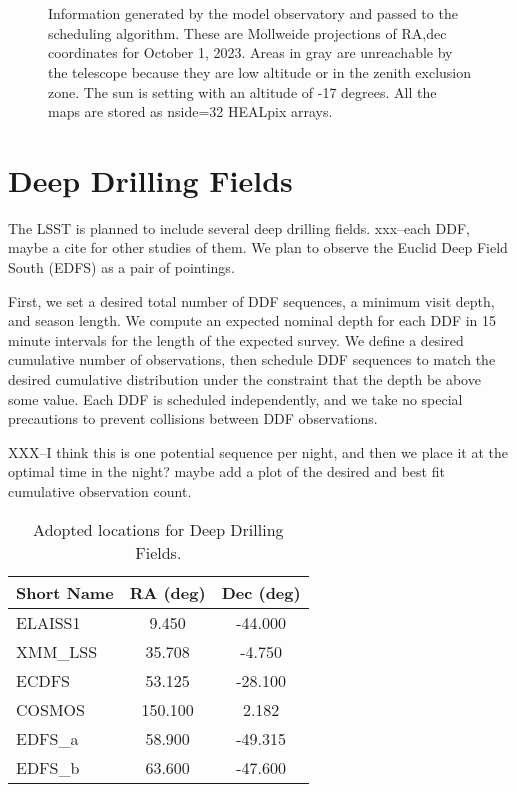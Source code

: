 \documentclass[]{aastex631}
\begin{document}
\begin{figure}
     \\
     \\
    \caption{Information generated by the model observatory and passed to the scheduling algorithm. These are Mollweide projections of RA,dec coordinates for October 1, 2023. Areas in gray are unreachable by the telescope because they are low altitude or in the zenith exclusion zone. The sun is setting with an altitude of -17 degrees. All the maps are stored as nside=32 HEALpix arrays. }
    \label{fig:conditions}
\end{figure}


\section{Deep Drilling Fields}

The LSST is planned to include several deep drilling fields. xxx--each DDF, maybe a cite for other studies of them. We plan to observe the Euclid Deep Field South (EDFS) as a pair of pointings. 

First, we set a desired total number of DDF sequences, a minimum visit depth, and season length. We compute an expected nominal depth for each DDF in 15 minute intervals for the length of the expected survey. We define a desired cumulative number of observations, then schedule DDF sequences to match the desired cumulative distribution under the constraint that the depth be above some value. Each DDF is scheduled independently, and we take no special precautions to prevent collisions between DDF observations. 

XXX--I think this is one potential sequence per night, and then we place it at the optimal time in the night? maybe add a plot of the desired and best fit cumulative observation count.



\begin{table}
    \centering
        \begin{tabular}{lcc}
        \toprule
        Short Name &      RA (deg) &     Dec (deg) \\
        \hline
           ELAISS1 &   9.450 & -44.000 \\
           XMM\_LSS &  35.708 &  -4.750 \\
             ECDFS &  53.125 & -28.100 \\
            COSMOS & 150.100 &   2.182 \\
            EDFS\_a &  58.900 & -49.315 \\
            EDFS\_b &  63.600 & -47.600 \\
        \hline
        \end{tabular}
    \caption{Adopted locations for Deep Drilling Fields.}
    \label{tab:ddf_loc}
\end{table}
\end{document}
